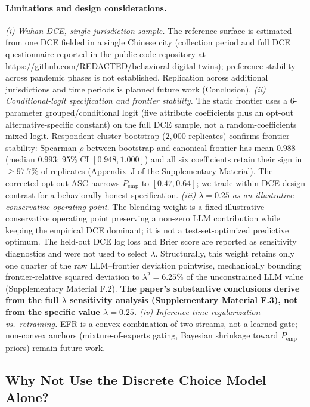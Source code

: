 \documentclass[11pt]{article}
\begin{document}
\paragraph*{Limitations and design considerations.} \emph{(i) Wuhan DCE, single-jurisdiction sample.} The reference surface is estimated from one DCE fielded in a single Chinese city (collection period and full DCE questionnaire reported in the public code repository at \url{https://github.com/REDACTED/behavioral-digital-twins}); preference stability across pandemic phases is not established. Replication across additional jurisdictions and time periods is planned future work (Conclusion). \emph{(ii) Conditional-logit specification and frontier stability.} The static frontier uses a 6-parameter grouped/conditional logit (five attribute coefficients plus an opt-out alternative-specific constant) on the full DCE sample, not a random-coefficients mixed logit. Respondent-cluster bootstrap ($2{,}000$ replicates) confirms frontier stability: Spearman $\rho$ between bootstrap and canonical frontier has mean $0.988$ (median $0.993$; 95\% CI $[0.948, 1.000]$) and all six coefficients retain their sign in $\geq 97.7\%$ of replicates (Appendix~J of the Supplementary Material). The corrected opt-out ASC narrows $P_{\mathrm{emp}}$ to $[0.47, 0.64]$; we trade within-DCE-design contrast for a behaviorally honest specification. \emph{(iii) \(\lambda = 0.25\) as an illustrative conservative operating point.} The blending weight is a fixed illustrative conservative operating point preserving a non-zero LLM contribution while keeping the empirical DCE dominant; it is not a test-set-optimized predictive optimum. The held-out DCE log loss and Brier score are reported as sensitivity diagnostics and were not used to select $\lambda$. Structurally, this weight retains only one quarter of the raw LLM--frontier deviation pointwise, mechanically bounding frontier-relative squared deviation to $\lambda^2 = 6.25\%$ of the unconstrained LLM value (Supplementary Material F.2). \textbf{The paper's substantive conclusions derive from the full $\lambda$ sensitivity analysis (Supplementary Material F.3), not from the specific value $\lambda = 0.25$.} \emph{(iv) Inference-time regularization vs.\ retraining.} EFR is a convex combination of two streams, not a learned gate; non-convex anchors (mixture-of-experts gating, Bayesian shrinkage toward $P_{\mathrm{emp}}$ priors) remain future work.

\subsection{Why Not Use the Discrete Choice Model Alone?}
\label{sec:why_not_dce}
\end{document}

